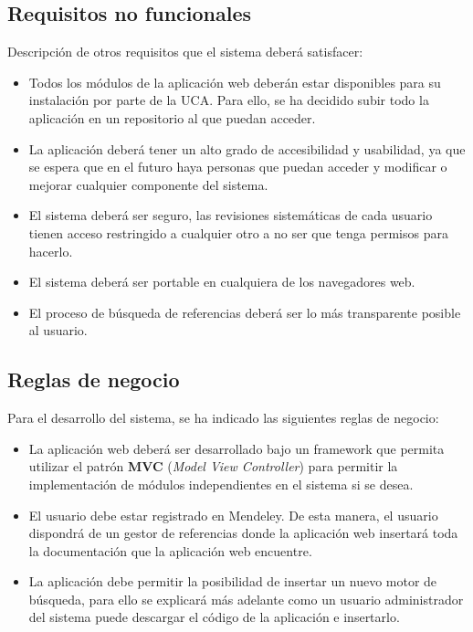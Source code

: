 \subsection{Requisitos no funcionales}
Descripción de otros requisitos que el sistema deberá satisfacer:

\begin{itemize}
	\item Todos los módulos de la aplicación web deberán estar disponibles para su instalación por parte de la UCA. Para ello, se ha decidido subir todo la aplicación en un repositorio al que puedan acceder.
	\item La aplicación deberá tener un alto grado de accesibilidad y usabilidad, ya que se espera que en el futuro haya personas que puedan acceder y modificar o mejorar cualquier componente del sistema.
	\item El sistema deberá ser seguro, las revisiones sistemáticas de cada usuario tienen acceso restringido a cualquier otro a no ser que tenga permisos para hacerlo.
	\item El sistema deberá ser portable en cualquiera de los navegadores web.
	\item El proceso de búsqueda de referencias deberá ser lo más transparente posible al usuario.
\end{itemize}

\subsection{Reglas de negocio}
Para el desarrollo del sistema, se ha indicado las siguientes reglas de negocio:

\begin{itemize}
	\item La aplicación web deberá ser desarrollado bajo un framework que permita utilizar el patrón \textbf{MVC} (\textit{Model View Controller}) para permitir la implementación de módulos independientes en el sistema si se desea.
	\item El usuario debe estar registrado en Mendeley. De esta manera, el usuario dispondrá de un gestor de referencias donde la aplicación web insertará toda la documentación que la aplicación web encuentre.
	\item La aplicación debe permitir la posibilidad de insertar un nuevo motor de búsqueda, para ello se explicará más adelante como un usuario administrador del sistema puede descargar el código de la aplicación e insertarlo.
\end{itemize}

